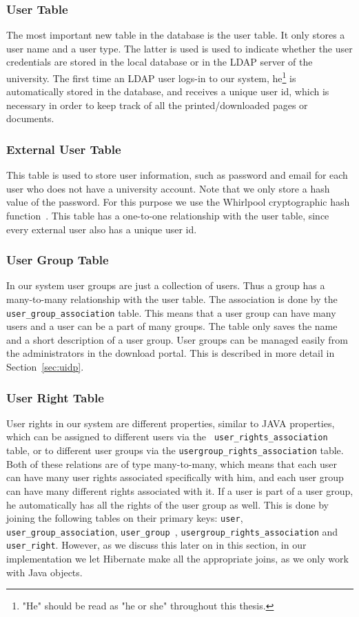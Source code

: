 \subsubsection{User Table}
The most important new table in the database is the user table. It only stores a user name and a user type. The latter is used is used to indicate whether the user credentials are stored in the local database or in the LDAP server of the university. The first time an LDAP user logs-in to our system, he\footnote{"He" should be read as "he or she" throughout this thesis.}
is automatically stored in the database, and receives a unique user id, which is necessary in order to keep track of all the printed/downloaded pages or documents. 

\subsubsection{External User Table}
This table is used to store user information, such as password and email for each user who does not have a university account. 
Note that we only store a hash value of the password. For this purpose we use the Whirlpool cryptographic hash function~\cite{wwhirlpool}.
This table has a one-to-one relationship with the user table, since every external user also has a unique user id.

\subsubsection{User Group Table}
In our system user groups are just a collection of users. Thus a group has a many-to-many relationship with the user table. The association is done by the \verb=user_group_association= table. This means that a user group can have many users and a user can be a part of many groups. The table only saves the name and a short description of a user group.  User groups can be managed easily from the administrators in the download portal. This is described in more detail in Section~\ref{sec:uidp}. 

\subsubsection{User Right Table}
User rights in our system are different properties, similar to JAVA properties, which can be assigned to different users via the
\verb= user_rights_association= table, or to different user groups via the 
\verb=usergroup_rights_association= table.  Both of these relations are of type many-to-many, which means that each user can have many user rights associated specifically with him, and each user group can have many different rights associated with it. If a user is part of a user group, 
he automatically has all the rights of the user group as well. This is done by joining the following tables on their primary keys:
\verb=user=,  \verb=user_group_association=, \verb=user_group =, \verb=usergroup_rights_association= and \verb=user_right=. However, as we discuss this later on in this section, in our implementation we let Hibernate make all the appropriate joins, as we only work with Java objects. 

